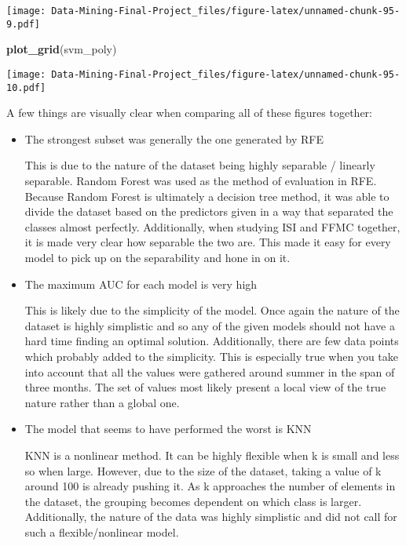 \documentclass[
]{article}
\newenvironment{Shaded}{\begin{snugshade}}{\end{snugshade}}
\newcommand{\FunctionTok}[1]{\textcolor[rgb]{0.13,0.29,0.53}{\textbf{#1}}}
\newcommand{\NormalTok}[1]{#1}
\begin{document}
\texttt{[image: Data-Mining-Final-Project\_files/figure-latex/unnamed-chunk-95-9.pdf]}

\begin{Shaded}
\begin{Highlighting}[]
\FunctionTok{plot\_grid}\NormalTok{(svm\_poly)}
\end{Highlighting}
\end{Shaded}

\texttt{[image: Data-Mining-Final-Project\_files/figure-latex/unnamed-chunk-95-10.pdf]}

A few things are visually clear when comparing all of these figures
together:

\begin{itemize}
\item
  The strongest subset was generally the one generated by RFE

  This is due to the nature of the dataset being highly separable /
  linearly separable. Random Forest was used as the method of evaluation
  in RFE. Because Random Forest is ultimately a decision tree method, it
  was able to divide the dataset based on the predictors given in a way
  that separated the classes almost perfectly. Additionally, when
  studying ISI and FFMC together, it is made very clear how separable
  the two are. This made it easy for every model to pick up on the
  separability and hone in on it.
\item
  The maximum AUC for each model is very high

  This is likely due to the simplicity of the model. Once again the
  nature of the dataset is highly simplistic and so any of the given
  models should not have a hard time finding an optimal solution.
  Additionally, there are few data points which probably added to the
  simplicity. This is especially true when you take into account that
  all the values were gathered around summer in the span of three
  months. The set of values most likely present a local view of the true
  nature rather than a global one.
\item
  The model that seems to have performed the worst is KNN

  KNN is a nonlinear method. It can be highly flexible when k is small
  and less so when large. However, due to the size of the dataset,
  taking a value of k around 100 is already pushing it. As k approaches
  the number of elements in the dataset, the grouping becomes dependent
  on which class is larger. Additionally, the nature of the data was
  highly simplistic and did not call for such a flexible/nonlinear
  model.
\end{itemize}
\end{document}
